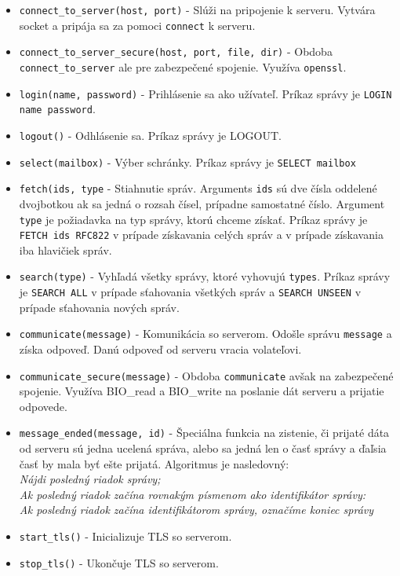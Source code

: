 \documentclass{article}
\begin{document}
\begin{itemize}
\item\texttt{connect\_to\_server(host, port)} - Slúži na pripojenie k serveru. Vytvára socket a pripája sa za pomoci \texttt{connect} k serveru.\\
\item\texttt{connect\_to\_server\_secure(host, port, file, dir)} - Obdoba \texttt{connect\_to\_server} ale pre zabezpečené spojenie. Využíva \texttt{openssl}.\\
\item\texttt{login(name, password)} - Prihlásenie sa ako užívateľ. Príkaz správy je \texttt{LOGIN name password}.\\
\item\texttt{logout()} - Odhlásenie sa. Príkaz správy je {LOGOUT}.\\
\item\texttt{select(mailbox)} - Výber schránky. Príkaz správy je \texttt{SELECT mailbox}\\
\item\texttt{fetch(ids, type} - Stiahnutie správ. Arguments \texttt{ids} sú dve čísla oddelené dvojbotkou ak sa jedná o rozsah čísel, prípadne samostatné číslo. Argument \texttt{type} je požiadavka na typ správy, ktorú chceme získať. Príkaz správy je \texttt{FETCH ids RFC822} v prípade získavania celých správ a  v prípade získavania iba hlavičiek správ.\\
\item\texttt{search(type)} - Vyhľadá všetky správy, ktoré vyhovujú \texttt{types}. Príkaz správy je \texttt{SEARCH ALL} v prípade sťahovania všetkých správ a \texttt{SEARCH UNSEEN} v prípade sťahovania nových správ.\\
\item\texttt{communicate(message)} - Komunikácia so serverom. Odošle správu \texttt{message} a získa odpoveď. Danú odpoveď od serveru vracia volateľovi.\\
\item\texttt{communicate\_secure(message)} - Obdoba \texttt{communicate} avšak na zabezpečené spojenie. Využíva BIO\_read a BIO\_write na poslanie dát serveru a prijatie odpovede.\\
\item\texttt{message\_ended(message, id)} - Špeciálna funkcia na zistenie, či prijaté dáta od serveru sú jedna ucelená správa, alebo sa jedná len o časť správy a ďaľsia časť by mala byť ešte prijatá. Algoritmus je nasledovný:\\
\textit{
Nájdi posledný riadok správy;\\
Ak posledný riadok začína rovnakým písmenom ako identifikátor správy:\\
Ak posledný riadok začína identifikátorom správy, označíme koniec správy\\}
\item\texttt{start\_tls()} - Inicializuje TLS so serverom.\\
\item\texttt{stop\_tls()} - Ukončuje TLS so serverom.\\
\end{itemize}
\end{document}
